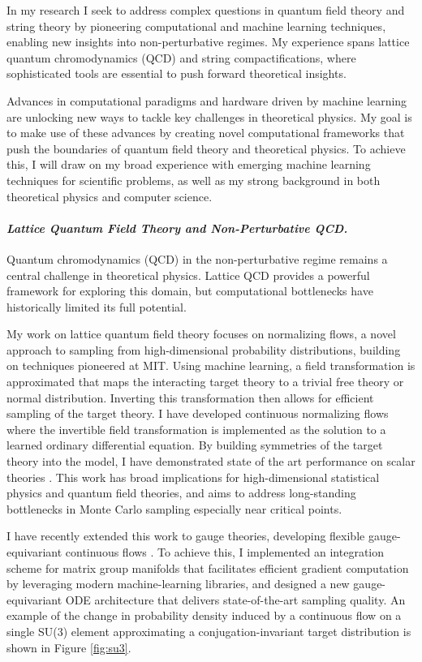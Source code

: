 \documentclass[11pt]{article}
\title{}
\author{}
\date{}
\begin{document}
\thispagestyle{firstpagestyle}


In my research I seek to address complex questions in quantum field theory and string theory by pioneering computational and machine learning techniques, enabling new insights into non-perturbative regimes.
My experience spans lattice quantum chromodynamics (QCD) and string compactifications, where sophisticated tools are essential to push forward theoretical insights.

Advances in computational paradigms and hardware driven by machine learning are unlocking new
ways to tackle key challenges in theoretical physics. My goal is to make use of these advances by creating novel computational
frameworks that push the boundaries of quantum field theory and theoretical physics. To achieve
this, I will draw on my broad experience with emerging machine learning techniques for scientific
problems, as well as my strong background in both theoretical physics and computer science.


\paragraph{\textit{{Lattice Quantum Field Theory and Non-Perturbative QCD.}}}
Quantum chromodynamics (QCD) in the non-perturbative regime remains a central challenge in theoretical physics. Lattice QCD provides a powerful framework for exploring this domain, but computational bottlenecks have historically limited its full potential.

My work on lattice quantum field theory focuses on normalizing flows, a novel approach to sampling from high-dimensional probability distributions, building on techniques pioneered at MIT.
Using machine learning, a field transformation is approximated that maps the interacting target theory to a trivial free theory or normal distribution.
Inverting this transformation then allows for efficient sampling of the target theory.
I have developed continuous normalizing flows where the invertible field transformation is implemented as the solution to a learned ordinary differential equation. By building symmetries of the target theory into the model, I have demonstrated state of the art performance on scalar theories \cite{gerdes2023LearningLattice}. This work has broad implications for high-dimensional statistical physics and quantum field theories, and aims to address long-standing bottlenecks in Monte Carlo sampling especially near critical points.

I have recently extended this work to gauge theories, developing flexible gauge-equivariant continuous flows \cite{gerdes2024continuousGauge}.
To achieve this, I implemented an integration scheme for matrix group manifolds that facilitates efficient gradient computation by leveraging modern machine-learning libraries, and designed a new gauge-equivariant ODE architecture that delivers state-of-the-art sampling quality.
An example of the change in probability density induced by a continuous flow on a single SU(3) element approximating a conjugation-invariant target distribution is shown in Figure \ref{fig:su3}.
\end{document}
